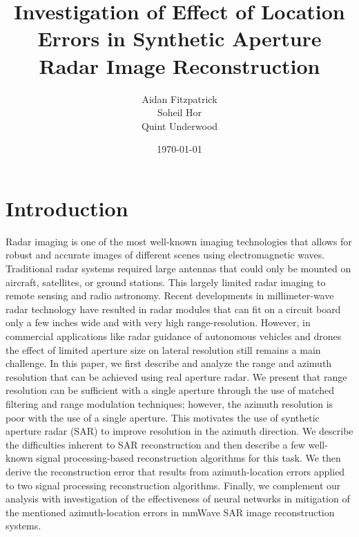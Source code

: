 \documentclass{article}
\title{Investigation of Effect of Location Errors in Synthetic Aperture Radar Image Reconstruction}
\author{Aidan Fitzpatrick \\ Soheil Hor \\ Quint Underwood }
\date{\today}
\begin{document}
\maketitle

\section{Introduction}
\indent \indent
Radar imaging is one of the most well-known imaging technologies that allows for robust and accurate images of different scenes using electromagnetic waves. Traditional radar systems required large antennas that could only be mounted on aircraft, satellites, or ground stations. This largely limited radar imaging to remote sensing and radio astronomy. Recent developments in millimeter-wave radar technology have resulted in radar modules that can fit on a circuit board only a few inches wide and with very high range-resolution. However, in commercial applications like radar guidance of autonomous vehicles and drones the effect of limited aperture size on lateral resolution still remains a main challenge.
\newline
\indent
In this paper, we first describe and analyze the range and azimuth resolution that can be achieved using real aperture radar. We present that range resolution can be sufficient with a single aperture through the use of matched filtering and range modulation techniques; however, the azimuth resolution is poor with the use of a single aperture. This motivates the use of synthetic aperture radar (SAR) to improve resolution in the azimuth direction. We describe the difficulties inherent to SAR reconstruction and then describe a few well-known signal processing-based reconstruction algorithms for this task. We then derive the reconstruction error that results from azimuth-location errors applied to two signal processing reconstruction algorithms. Finally, we complement our analysis with investigation of the effectiveness of neural networks in mitigation of the mentioned azimuth-location errors in mmWave SAR image reconstruction systems.
\end{document}
